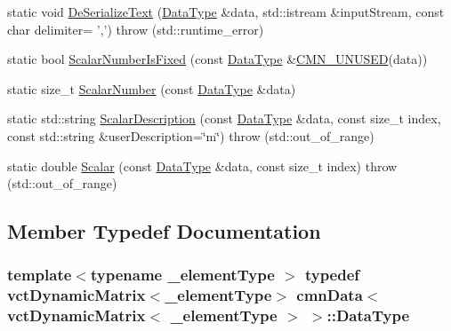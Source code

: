 \begin{DoxyCompactItemize}
\item 
static void \hyperlink{classcmn_data_3_01vct_dynamic_matrix_3_01__element_type_01_4_01_4_a4a322e922936c7d8eaa20ed72aed2e3a}{De\-Serialize\-Text} (\hyperlink{classcmn_data_3_01vct_dynamic_matrix_3_01__element_type_01_4_01_4_aac077247ac3ce4c624c4636509abe930}{Data\-Type} \&data, std\-::istream \&input\-Stream, const char delimiter= ',')  throw (std\-::runtime\-\_\-error)
\item 
static bool \hyperlink{classcmn_data_3_01vct_dynamic_matrix_3_01__element_type_01_4_01_4_a0266f9fecffbde87af0b78d740b368aa}{Scalar\-Number\-Is\-Fixed} (const \hyperlink{classcmn_data_3_01vct_dynamic_matrix_3_01__element_type_01_4_01_4_aac077247ac3ce4c624c4636509abe930}{Data\-Type} \&\hyperlink{cmn_portability_8h_a021894e2626935fa2305434b1e893ff6}{C\-M\-N\-\_\-\-U\-N\-U\-S\-E\-D}(data))
\item 
static size\-\_\-t \hyperlink{classcmn_data_3_01vct_dynamic_matrix_3_01__element_type_01_4_01_4_a2549babd27062a6ed15f9a6d62d74935}{Scalar\-Number} (const \hyperlink{classcmn_data_3_01vct_dynamic_matrix_3_01__element_type_01_4_01_4_aac077247ac3ce4c624c4636509abe930}{Data\-Type} \&data)
\item 
static std\-::string \hyperlink{classcmn_data_3_01vct_dynamic_matrix_3_01__element_type_01_4_01_4_afc289dfad0ed05e995c22f25458a621c}{Scalar\-Description} (const \hyperlink{classcmn_data_3_01vct_dynamic_matrix_3_01__element_type_01_4_01_4_aac077247ac3ce4c624c4636509abe930}{Data\-Type} \&data, const size\-\_\-t index, const std\-::string \&user\-Description=\char`\"{}m\char`\"{})  throw (std\-::out\-\_\-of\-\_\-range)
\item 
static double \hyperlink{classcmn_data_3_01vct_dynamic_matrix_3_01__element_type_01_4_01_4_a1305843fa6d12b863a1485427a59967c}{Scalar} (const \hyperlink{classcmn_data_3_01vct_dynamic_matrix_3_01__element_type_01_4_01_4_aac077247ac3ce4c624c4636509abe930}{Data\-Type} \&data, const size\-\_\-t index)  throw (std\-::out\-\_\-of\-\_\-range)
\end{DoxyCompactItemize}


\subsection{Member Typedef Documentation}
\hypertarget{classcmn_data_3_01vct_dynamic_matrix_3_01__element_type_01_4_01_4_aac077247ac3ce4c624c4636509abe930}{
\subsubsection[{Data\-Type}]{\setlength{\rightskip}{0pt plus 5cm}template$<$typename \-\_\-element\-Type $>$ typedef {\bf vct\-Dynamic\-Matrix}$<$\-\_\-element\-Type$>$ {\bf cmn\-Data}$<$ {\bf vct\-Dynamic\-Matrix}$<$ \-\_\-element\-Type $>$ $>$\-::{\bf Data\-Type}}}\label{classcmn_data_3_01vct_dynamic_matrix_3_01__element_type_01_4_01_4_aac077247ac3ce4c624c4636509abe930}


